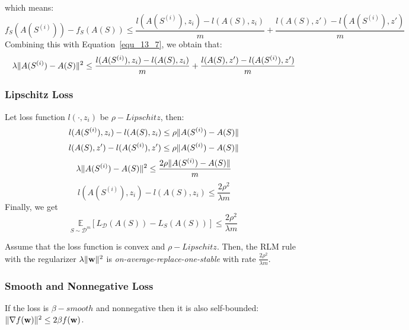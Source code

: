 which means:
\begin{equation}
	f_S(A(S^{(i)})) - f_S(A(S)) \le
	\frac{l(A(S^{(i)}),z_i) - l(A(S), z_i)}{m}
	+ \frac{l(A(S), z')-l(A(S^{(i)}),z')}{m}
\end{equation}
Combining this with Equation~\ref{equ_13_7}, we obtain that:
\begin{equation}
	\label{equ_13_10}
	\lambda \Arrowvert A(S^{(i)}) - A(S) \Arrowvert^2 \le
	\frac{l(A(S^{(i)}),z_i) - l(A(S), z_i)}{m}
	+ \frac{l(A(S), z')-l(A(S^{(i)}),z')}{m}
\end{equation}


\subsubsection{Lipschitz Loss}

Let loss function $ l(\cdot, z_i) $ be $ \rho-Lipschitz $, then:
\[
	l(A(S^{(i)}),z_i) - l(A(S), z_i) \le \rho \Arrowvert A(S^{(i)}) - A(S) \Arrowvert \\
\]
\[
	l(A(S), z')-l(A(S^{(i)}),z') \le \rho \Arrowvert A(S^{(i)}) - A(S) \Arrowvert
\]
\[
\lambda \Arrowvert A(S^{(i)}) - A(S) \Arrowvert^2 \le \frac{2\rho \Arrowvert A(S^{(i)}) - A(S) \Arrowvert}{m}
\]
\[
	l(A(S^{(i)}),z_i) - l(A(S), z_i) \le \frac{2\rho^2}{\lambda m}
\]
Finally, we get
\begin{equation}
	\underset{S \sim \mathcal{D}^m}{\mathbb{E}}
	[L_\mathcal{D}(A(S)) - L_S(A(S))] \le \frac{2\rho^2}{\lambda m}
\end{equation}

\begin{thm}
	Assume that the loss function is convex and $ \rho-Lipschitz $. Then, the RLM rule with the regularizer
	$ \lambda \Arrowvert \mathbf{w} \Arrowvert^2 $ is \emph{on-average-replace-one-stable} 
	with rate $ \frac{2\rho^2}{\lambda m} $.
\end{thm}

\subsubsection{Smooth and Nonnegative Loss}

If the loss is $ \beta-smooth $ and nonnegative then it is also self-bounded:
$ \Arrowvert \nabla f(\mathbf{w}) \Arrowvert^2 \le 2 \beta f(\mathbf{w}) $.

